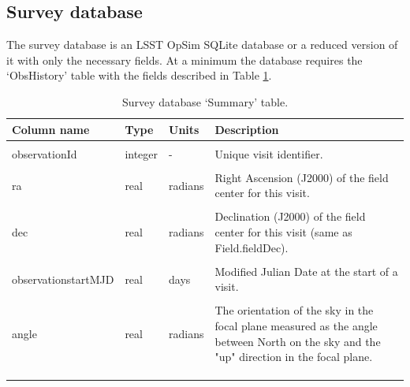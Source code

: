 \documentclass[10pt,a4paper]{article}
\begin{document}
\subsection{Survey database}

The survey database is an LSST OpSim SQLite database or a reduced
version of it with only the necessary fields. At a minimum the database
requires the `ObsHistory' table with the fields described in Table
\ref{tab:sumdesc}.

\begin{longtable}{l l p{20mm} p{50mm}}
    \hline
    Column name                   & Type     & Units   & Description\\
    \hline \hline \\
    observationId                 & integer  & -       & Unique visit identifier. \\ \\
    ra                            & real     & radians & Right Ascension (J2000) of the field center for this visit. \\ \\
    dec                           & real     & radians & Declination (J2000) of the field center for this visit (same as Field.fieldDec).\\ \\
    observationstartMJD           & real     & days    & Modified Julian Date at the start of a visit. \\ \\
    angle                         & real     & radians & The orientation of the sky in the focal plane measured 
                                                         as the angle between North on the sky and the "up" direction 
                                                         in the focal plane. \\ \\
\hline \\


\caption{Survey database `Summary' table.}
\label{tab:sumdesc}                                                                   
\end{longtable}
\end{document}
